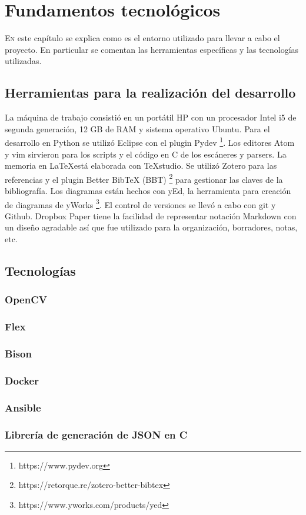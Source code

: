 
\chapter{Fundamentos tecnológicos}
\label{chap:fundamentos-tecnologicos}

\lettrine{E}n este capítulo se explica como es el entorno utilizado para llevar a cabo el proyecto. En particular se comentan las herramientas específicas y las tecnologías utilizadas.

\section{Herramientas para la realización del desarrollo}

La máquina de trabajo consistió en un portátil HP con un procesador Intel i5 de segunda generación, 12 GB de RAM y sistema operativo Ubuntu. Para el desarrollo en Python se utilizó Eclipse con el plugin Pydev
\footnote{https://www.pydev.org}. Los editores Atom y vim sirvieron para los scripts y el código en C de los escáneres y parsers. La memoria en \LaTeX está elaborada con TeXstudio. Se utilizó Zotero para las referencias y el plugin Better BibTeX (BBT) 
\footnote{https://retorque.re/zotero-better-bibtex} para gestionar las claves de la bibliografía. Los diagramas están hechos con yEd, la herramienta para creación de diagramas de yWorks 
\footnote{https://www.yworks.com/products/yed}. El control de versiones se llevó a cabo con git y Github. Dropbox Paper tiene la facilidad de representar notación Markdown con un diseño agradable así que fue utilizado para la organización, borradores, notas, etc.

\section{Tecnologías}

\subsection{OpenCV}

\subsection{Flex}

\subsection{Bison}

\subsection{Docker}

\subsection{Ansible}

\subsection{Librería de generación de JSON en C}